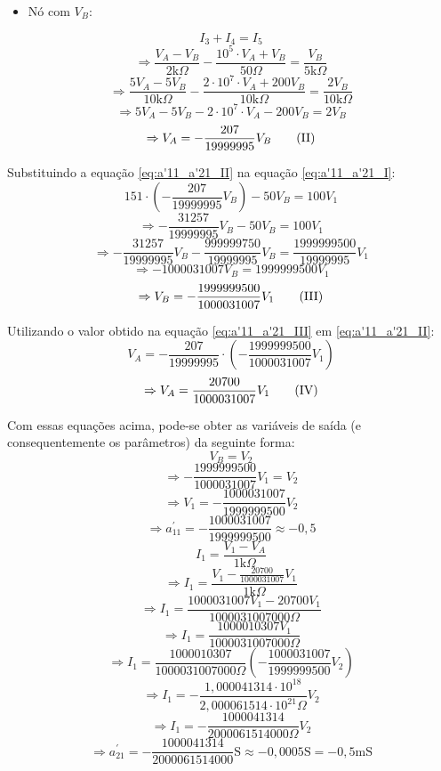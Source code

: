 \documentclass{report}
\begin{document}
\begin{itemize}
  \item Nó com $ V_B $:
\end{itemize}
$$ I_3 + I_4 = I_5 $$
$$ \Rightarrow \frac{V_A - V_B}{2 \text{k}\Omega} - \frac{10^5 \cdot V_A + V_B}{50\Omega} = \frac{V_B}{5 \text{k}\Omega} $$
$$ \Rightarrow \frac{5V_A - 5V_B}{10 \text{k}\Omega} - \frac{2 \cdot 10^7 \cdot V_A + 200V_B}{10\text{k}\Omega} = \frac{2V_B}{10 \text{k}\Omega} $$
$$ \Rightarrow 5V_A - 5V_B - 2 \cdot 10^7 \cdot V_A - 200V_B = 2V_B $$
\begin{equation}
  \label{eq:a'11_a'21_II}
  \centering
  \Rightarrow V_A = - \frac{207}{19999995}V_B \tag{II}
\end{equation}

Substituindo a equação \ref{eq:a'11_a'21_II} na equação \ref{eq:a'11_a'21_I}:
$$ 151 \cdot \left(- \frac{207}{19999995}V_B \right) - 50V_B = 100V_1 $$
$$ \Rightarrow - \frac{31257}{19999995}V_B - 50V_B = 100V_1 $$
$$ \Rightarrow - \frac{31257}{19999995}V_B - \frac{999999750}{19999995}V_B = \frac{1999999500}{19999995}V_1 $$
$$ \Rightarrow - 1000031007V_B = 1999999500V_1 $$
\begin{equation}
  \label{eq:a'11_a'21_III}
  \centering
  \Rightarrow V_B = - \frac{1999999500}{1000031007}V_1 \tag{III}
\end{equation}

Utilizando o valor obtido na equação \ref{eq:a'11_a'21_III} em \ref{eq:a'11_a'21_II}:
$$ V_A = - \frac{207}{19999995} \cdot \left( - \frac{1999999500}{1000031007}V_1 \right) $$
\begin{equation}
  \label{eq:a'11_a'21_IV}
  \centering
  \Rightarrow V_A = \frac{20700}{1000031007}V_1 \tag{IV}
\end{equation}

Com essas equações acima, pode-se obter as variáveis de saída (e consequentemente os parâmetros) da seguinte forma:
$$ V_B = V_2 $$
$$ \Rightarrow - \frac{1999999500}{1000031007}V_1 = V_2 $$
$$ \Rightarrow V_1 = - \frac{1000031007}{1999999500}V_2 $$
$$ \Rightarrow a^{'}_{11} = - \frac{1000031007}{1999999500} \approx - 0,\!5 $$
$$ I_1 = \frac{V_1 - V_A}{1 \text{k}\Omega} $$
$$ \Rightarrow I_1 = \frac{V_1 - \frac{20700}{1000031007}V_1}{1 \text{k}\Omega} $$
$$ \Rightarrow I_1 = \frac{1000031007V_1 - 20700V_1}{1000031007000 \Omega} $$
$$ \Rightarrow I_1 = \frac{1000010307V_1}{1000031007000\Omega} $$
$$ \Rightarrow I_1 = \frac{1000010307}{1000031007000\Omega}\left(- \frac{1000031007}{1999999500}V_2\right) $$
$$ \Rightarrow I_1 = - \frac{1,\!000041314 \cdot 10^{18}}{2,\!000061514 \cdot 10^{21}\Omega}V_2 $$
$$ \Rightarrow I_1 = - \frac{1000041314}{2000061514000\Omega}V_2 $$
$$ \Rightarrow a^{'}_{21} = - \frac{1000041314}{2000061514000}\text{S} \approx - 0,0005\text{S} = - 0,\!5\text{mS} $$
\end{document}
